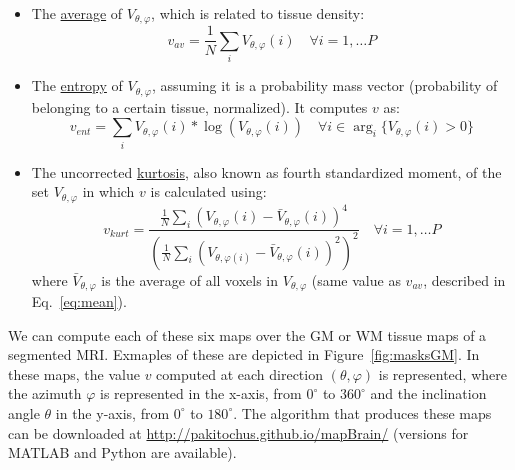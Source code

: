 \begin{itemize}
	\item The \underline{average} of $V_{\theta,\varphi}$, which is related to tissue density: 
	\begin{equation}\label{eq:mean}
	v_{av}=\frac{1}{N}\sum_i V_{\theta,\varphi}(i) \quad \forall i=1,\dots P
	\end{equation}  
	
	\item The \underline{entropy} of $V_{\theta,\varphi}$, assuming it is a probability mass vector (probability of belonging to a certain tissue, normalized). It computes $v$ as:
	\begin{equation}
	v_{ent}=\sum_i V_{\theta,\varphi}(i)*\log(V_{\theta,\varphi}(i)) \quad \forall i \in \arg_i\lbrace V_{\theta,\varphi}(i)>0\rbrace
	\end{equation}
	
	\item The uncorrected \underline{kurtosis}, also known as fourth standardized moment, of the set $V_{\theta,\varphi}$ in which $v$ is calculated using:
	\begin{equation}
	v_{kurt}= \frac{\frac{1}{N}\sum_i\left(V_{\theta,\varphi}(i)-\bar{V}_{\theta,\varphi}(i)\right)^4}{\left(\frac{1}{N}\sum_i\left(V_{\theta,\varphi(i)}-\bar{V}_{\theta,\varphi}(i)\right)^2\right)^2} \quad \forall i=1,\dots P
	\end{equation}
	where $\bar{V}_{\theta,\varphi}$ is the average of all voxels in $V_{\theta,\varphi}$ (same value as $v_{av}$, described in Eq.~\ref{eq:mean}). 
	
\end{itemize}

We can compute each of these six maps over the \ac{GM} or \ac{WM} tissue maps of a segmented \ac{MRI}. Exmaples of these are depicted in Figure~\ref{fig:masksGM}. In these maps, the value $v$ computed at each direction $(\theta,\varphi)$ is represented, where the azimuth $\varphi$ is represented in the x-axis, from $0^{\circ}$ to $360^{\circ}$ and the inclination angle $\theta$ in the y-axis, from $0^{\circ}$ to $180^{\circ}$. The algorithm that produces these maps can be downloaded at \url{http://pakitochus.github.io/mapBrain/} (versions for MATLAB and Python are available).

